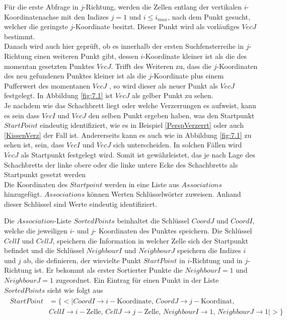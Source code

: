 Für die erste Abfrage in $j$-Richtung, werden die Zellen entlang der vertikalen $i$-Koordinatenachse mit den Indizes $j=1$ und $i \leq i_{max}$, nach dem Punkt gesucht, welcher die geringste $j$-Koordinate besitzt. Dieser Punkt wird als vorläufiges $VecJ$ bestimmt.\\

Danach wird auch hier geprüft, ob es innerhalb der ersten Suchfensterreihe in $j$-Richtung einen weiteren Punkt gibt, dessen $i$-Koordinate kleiner ist als die des momentan gesetzten Punktes $VecJ$. Trifft des Weiteren zu, dass die $j$-Koordinaten des neu gefundenen Punktes kleiner ist als die $j$-Koordinate plus einem Pufferwert des momentanen $VecJ$ , so wird dieser als neuer Punkt als $VecJ$ festgelegt. In Abbildung \ref{fig:7.1} ist $VecJ$ als gelber Punkt zu sehen.\\

Je nachdem wie das Schachbrett liegt oder welche Verzerrungen es aufweist, kann es sein dass $VecI$ und $VecJ$ den selben Punkt ergeben haben, was den Startpunkt $StartPoint$ eindeutig identifiziert, wie es in Beispiel \ref{PerspVerzerrt} oder auch \ref{KissenVerz} der Fall ist. Andererseits kann es auch wie in Abbildung \ref{fig:7.1} zu sehen ist, sein, dass $VecI$ und $VecJ$ sich unterscheiden. In solchen Fällen wird $VecJ$ als Startpunkt festgelegt wird. Somit ist gewährleistet, das je nach Lage des Schachbretts der linke obere oder die linke untere Ecke des Schachbretts als Startpunkt gesetzt werden\\

Die Koordinaten des $Startpoint$ werden in eine Liste aus $Associations$ \cite{Mathematica} hinzugefügt. $Associations$ können Werten Schlüsselwörter zuweisen. Anhand dieser Schlüssel sind Werte eindeutig identifiziert. 

Die $Association$-Liste $SortedPoints$ beinhaltet die Schlüssel $CoordJ$ und $CoordI$, welche die jeweiligen $i$- und $j$- Koordinaten des Punktes speichern. Die Schlüssel $CellI$ und $CellJ$, speichern die Information in welcher Zelle sich der Startpunkt befindet und die Schlüssel $NeighbourI$ und $NeighbourJ$ speichern die Indizes $i$ und $j$ ab, die definieren, der wievielte Punkt $StartPoint$ in $i$-Richtung und in $j$-Richtung ist. Er bekommt als erster Sortierter Punkte die $NeighbourI = 1$ und $NeighbourJ = 1$ zugeordnet. Ein Eintrag für einen Punkt in der Liste $SortedPoints$ sieht wie folgt aus \\

\begin{gather*}
	\begin{split}
			StartPoint &= \{ <|CoordI \rightarrow i-\text{Koordinate},\, CoordJ \rightarrow j-\text{Koordinat},\, \\
			&CellI \rightarrow i-\text{Zelle},\, CellJ \rightarrow j-\text{Zelle},\,
			NeighbourI \rightarrow 1, \,NeighbourJ \rightarrow 1  |>\}
	\end{split}
\end{gather*}
 
